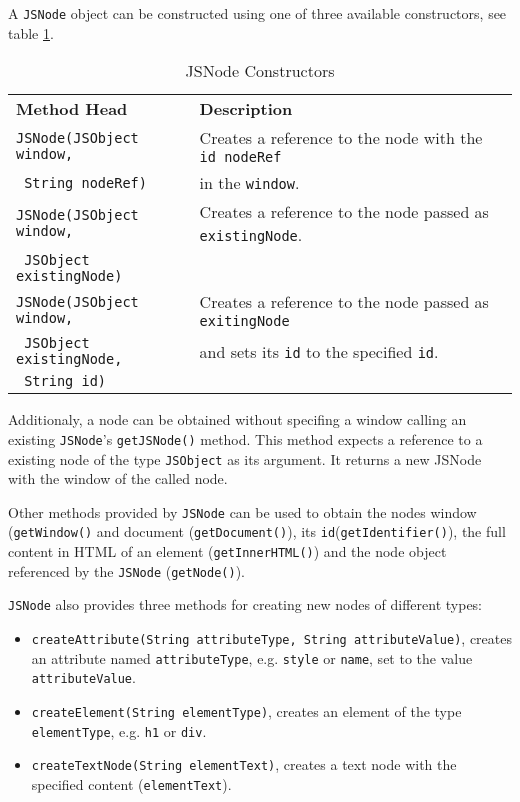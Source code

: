 

A \texttt{JSNode} object can be constructed using one of three available constructors, see table \ref{tab:JSNodeConstructors}.

\begin{table}[htbp]
	\centering
		\begin{tabular}{ll}
			\textbf{Method Head} & \textbf{Description} \\
			\texttt{JSNode(JSObject window,} & Creates a reference to the node with the \texttt{id nodeRef}\\
			\texttt{ String nodeRef)}&  in the \texttt{window}.\\
			
			\texttt{JSNode(JSObject window,}& Creates a reference to the node passed as \texttt{existingNode}.\\
			\texttt{ JSObject existingNode)}& \\
			
			\texttt{JSNode(JSObject window,}& Creates a reference to the node passed as \texttt{exitingNode}\\
			\texttt{ JSObject existingNode,}&  and sets its \texttt{id} to the specified \texttt{id}.\\
			\texttt{ String id)}& \\
		\end{tabular}
	\caption{JSNode Constructors}
	\label{tab:JSNodeConstructors}
\end{table}

Additionaly, a node can be obtained without specifing a window calling an existing \texttt{JSNode}'s \texttt{getJSNode()} method. This method expects a reference to a existing node of the type \texttt{JSObject} as its argument. It returns a new JSNode with the window of the called node.


Other methods provided by \texttt{JSNode} can be used to obtain the nodes window (\texttt{getWindow()} and document (\texttt{getDocument()}), its \texttt{id}(\texttt{getIdentifier()}), the full content in HTML of an element (\texttt{getInnerHTML()}) and the node object referenced by the \texttt{JSNode} (\texttt{getNode()}).

\texttt{JSNode} also provides three methods for creating new nodes of different types:

\begin{itemize}
	\item \texttt{createAttribute(String attributeType, String attributeValue)}, creates an attribute named \texttt{attributeType}, e.g. \texttt{style} or \texttt{name}, set to the value \texttt{attributeValue}.
	\item \texttt{createElement(String elementType)}, creates an element of the type \texttt{elementType}, e.g. \texttt{h1} or \texttt{div}.
	\item \texttt{createTextNode(String elementText)}, creates a text node with the specified content (\texttt{elementText}).
\end{itemize}

